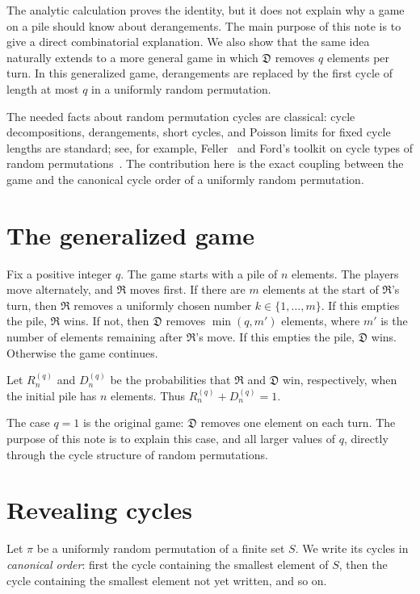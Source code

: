 \documentclass{article}
\newcommand{\Rplayer}{\mathfrak{R}}
\newcommand{\Dplayer}{\mathfrak{D}}
\begin{document}
The analytic calculation proves the identity, but it does not explain why a
game on a pile should know about derangements. The main purpose of this note is
to give a direct combinatorial explanation. We also show that the same idea
naturally extends to a more general game in which $\Dplayer$ removes $q$
elements per turn. In this generalized game, derangements are replaced by the
first cycle of length at most $q$ in a uniformly random permutation.

The needed facts about random permutation cycles are classical: cycle
decompositions, derangements, short cycles, and Poisson limits for fixed cycle
lengths are standard; see, for example, Feller~\cite{feller} and Ford's toolkit
on cycle types of random permutations~\cite{ford2022cycle}. The contribution
here is the exact coupling between the game and the canonical cycle order of a
uniformly random permutation.

\section{The generalized game}

Fix a positive integer $q$. The game starts with a pile of $n$ elements. The
players move alternately, and $\Rplayer$ moves first. If there are $m$ elements
at the start of $\Rplayer$'s turn, then $\Rplayer$ removes a uniformly chosen
number $k\in\{1,\ldots,m\}$. If this empties the pile, $\Rplayer$ wins. If not,
then $\Dplayer$ removes $\min(q,m')$ elements, where $m'$ is the number of
elements remaining after $\Rplayer$'s move. If this empties the pile,
$\Dplayer$ wins. Otherwise the game continues.

Let $R_n^{(q)}$ and $D_n^{(q)}$ be the probabilities that $\Rplayer$ and
$\Dplayer$ win, respectively, when the initial pile has $n$ elements. Thus
$R_n^{(q)}+D_n^{(q)}=1$.

The case $q=1$ is the original game: $\Dplayer$ removes one element on each
turn. The purpose of this note is to explain this case, and all larger values
of $q$, directly through the cycle structure of random permutations.

\section{Revealing cycles}

Let $\pi$ be a uniformly random permutation of a finite set $S$. We write its
cycles in \emph{canonical order}: first the cycle containing the smallest
element of $S$, then the cycle containing the smallest element not yet written,
and so on.
\end{document}
